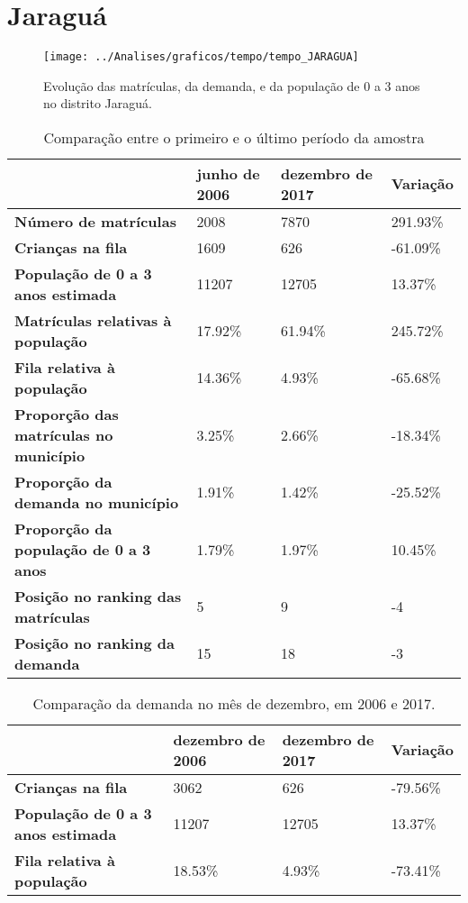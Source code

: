 \section{Jaraguá}
\begin{figure}[H]
\centering
\texttt{[image: ../Analises/graficos/tempo/tempo\_JARAGUA]}
\caption{Evolução das matrículas, da demanda, e da população de 0 a 3 anos no distrito Jaraguá.}
\end{figure}
\begin{table}[H]
\begin{tabular}{|l|l|l|l|}
\hline
\textbf{}                                      & \textbf{junho de 2006}       & \textbf{dezembro de 2017}    & \textbf{Variação} \\ \hline
\textbf{Número de matrículas}                  & 2008 & 7870 & 291.93\% \\ \hline
\textbf{Crianças na fila}                      & 1609 & 626 & -61.09\% \\ \hline
\textbf{População de 0 a 3 anos estimada}      & 11207 & 12705 & 13.37\% \\ \hline
\textbf{Matrículas relativas à população}      & 17.92\% & 61.94\% & 245.72\% \\ \hline
\textbf{Fila relativa à população}             & 14.36\% & 4.93\% & -65.68\% \\ \hline
\textbf{Proporção das matrículas no município} & 3.25\% & 2.66\% & -18.34\% \\ \hline
\textbf{Proporção da demanda no município}     & 1.91\% & 1.42\% & -25.52\% \\ \hline
\textbf{Proporção da população de 0 a 3 anos}  & 1.79\% & 1.97\% & 10.45\% \\ \hline
\textbf{Posição no ranking das matrículas}     & 5 & 9 & -4 \\ \hline
\textbf{Posição no ranking da demanda}         & 15 & 18 & -3 \\ \hline
\end{tabular}
\caption{Comparação entre o primeiro e o último período da amostra}
\end{table}
\begin{table}[H]
\begin{tabular}{|l|l|l|l|}
\hline
\textbf{}                                 & \textbf{dezembro de 2006} & \textbf{dezembro de 2017} & \textbf{Variação} \\ \hline
\textbf{Crianças na fila}                      & 3062 & 626 & -79.56\% \\ \hline
\textbf{População de 0 a 3 anos estimada}      & 11207 & 12705 & 13.37\% \\ \hline
\textbf{Fila relativa à população}             & 18.53\% & 4.93\% & -73.41\% \\ \hline
\end{tabular}
\caption{Comparação da demanda no mês de dezembro, em 2006 e 2017.}
\end{table}
